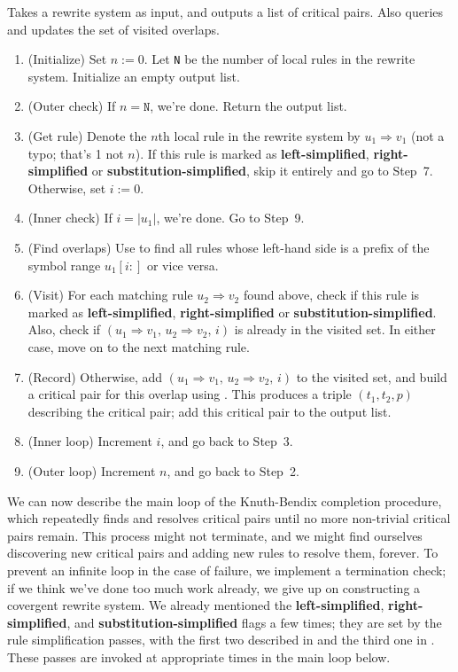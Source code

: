 \documentclass[../generics]{subfiles}
\begin{document}
\begin{algorithm}\label{find overlapping rule algo}
Takes a rewrite system as input, and outputs a list of critical pairs. Also queries and updates the set of visited overlaps.
\begin{enumerate}
\item (Initialize) Set $n:=0$. Let \texttt{N} be the number of local rules in the rewrite system. Initialize an empty output list.
\item (Outer check) If $n=\texttt{N}$, we're done. Return the output list.
\item (Get rule) Denote the $n$th local rule in the rewrite system by $u_1\Rightarrow v_1$ (not a typo; that's 1 not $n$). If this rule is marked as \textbf{left-simplified}, \textbf{right-simplified} or \textbf{substitution-simplified}, skip it entirely and go to Step~7. Otherwise, set $i:=0$.
\item (Inner check) If $i=|u_1|$, we're done. Go to Step~9.
\item (Find overlaps) Use  to find all rules whose left-hand side is a prefix of the symbol range $u_1[i:]$ or vice versa.
\item (Visit) For each matching rule $u_2\Rightarrow v_2$ found above, check if this rule is marked as \textbf{left-simplified}, \textbf{right-simplified} or \textbf{substitution-simplified}. Also, check if $(u_1\Rightarrow v_1,\,u_2\Rightarrow v_2,\,i)$ is already in the visited set. In either case, move on to the next matching rule.
\item (Record) Otherwise, add $(u_1\Rightarrow v_1,\,u_2\Rightarrow v_2,\,i)$ to the visited set, and build a critical pair for this overlap using . This produces a triple $(t_1, t_2, p)$ describing the critical pair; add this critical pair to the output list.
\item (Inner loop) Increment $i$, and go back to Step~3.
\item (Outer loop) Increment $n$, and go back to Step~2.
\end{enumerate}
\end{algorithm}

We can now describe the main loop of the Knuth-Bendix completion procedure, which repeatedly finds and resolves critical pairs until no more non-trivial critical pairs remain. This process might not terminate, and we might find ourselves discovering new critical pairs and adding new rules to resolve them, forever. To prevent an infinite loop in the case of failure, we implement a termination check; if we think we've done too much work already, we give up on constructing a covergent rewrite system. We already mentioned the \textbf{left-simplified}, \textbf{right-simplified}, and \textbf{substitution-simplified} flags a few times; they are set by the rule simplification passes, with the first two described in  and the third one in . These passes are invoked at appropriate times in the main loop below.
\end{document}
